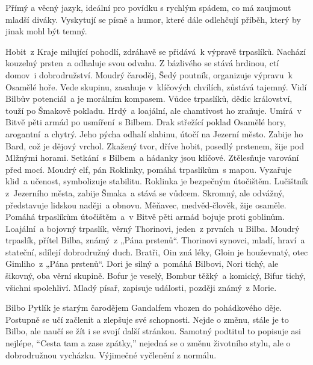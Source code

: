 \documentclass{extarticle} %
\begin{document}


\noindent Přímý a věcný jazyk, ideální pro povídku s rychlým spádem, co má zaujmout mladší diváky.
Vyskytují se písně a humor, které dále odlehčují příběh, který by jinak mohl být temný.

\noindent 
{} Hobit~z Kraje milující pohodlí,
zdráhavě se přidává~k výpravě trpaslíků.
Nachází kouzelný prsten~a odhaluje svou odvahu.
Z bázlivého se stává hrdinou, ctí domov~i dobrodružství.
 Moudrý čaroděj, Šedý poutník, organizuje výpravu~k Osamělé hoře.
Vede skupinu, zasahuje v~klíčových chvílích, zůstává tajemný.
Vidí Bilbův potenciál~a je morálním kompasem.
 Vůdce trpaslíků, dědic království, touží po Šmakově pokladu.
Hrdý~a loajální, ale chamtivost ho zraňuje.
Umírá~v Bitvě pěti armád po usmíření~s Bilbem.
 Drak střežící poklad Osamělé hory, arogantní~a chytrý.
Jeho pýcha odhalí slabinu, útočí na Jezerní město.
Zabije ho Bard, což je dějový vrchol.
 Zkažený tvor, dříve hobit, posedlý prstenem, žije pod Mlžnými horami.
Setkání~s Bilbem~a hádanky jsou klíčové.
Ztělesňuje varování před mocí.
 Moudrý elf, pán Roklinky, pomáhá trpaslíkům~s mapou.
Vyzařuje klid~a učenost, symbolizuje stabilitu.
Roklinka je bezpečným útočištěm.
 Lučištník z~Jezerního města, zabije Šmaka~a stává se vůdcem.
Skromný, ale odvážný, představuje lidskou naději~a obnovu.
 Měňavec, medvěd-člověk, žije osaměle.
Pomáhá trpaslíkům útočištěm~a~v Bitvě pěti armád bojuje proti goblinům.
 Loajální~a bojovný trpaslík, věrný Thorinovi, jeden~z prvních~u Bilba.
 Moudrý trpaslík, přítel Bilba, známý~z „Pána prstenů“.
 Thorinovi synovci, mladí, hraví~a stateční,
sdílejí dobrodružný duch.
 Bratři, Oin zná léky, Gloin je houževnatý,
otec Gimliho~z „Pána prstenů“.
 Dori je silný a~pomáhá Bilbovi, Nori tichý, ale šikovný,
oba věrní skupině.
 Bofur je veselý, Bombur těžký~a komický,
Bifur tichý, všichni spolehliví.
 Mladý písař, zapisuje události, později známý~z Morie.

\noindent 
Bilbo Pytlík je starým čarodějem Gandalfem vhozen do pohádkového děje.
Postupně se učí začlenit a zlepšuje své schopnosti.
Nejde o změnu, stále je to Bilbo, ale naučí se žít i se svojí další stránkou.
Samotný podtitul to popisuje asi nejlépe, \enquote{Cesta tam a zase zpátky,} nejedná se o změnu životního stylu, ale o dobrodružnou vycházku.
Výjimečné vyčlenění z normálu.
\end{document}
